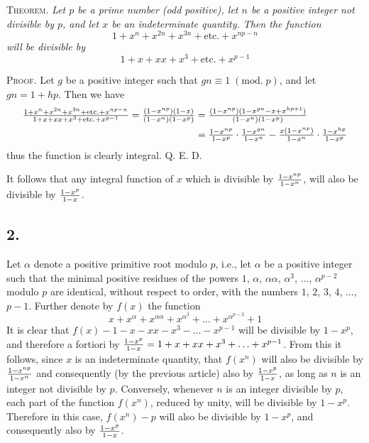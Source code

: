 \documentclass[twoside,12pt]{memoir}
\renewcommand{\pmod}[1]{\;(\textrm{mod.}\;#1)}
\let\oldfrac\frac
\def\frac#1#2{\mathchoice{\tfrac{#1}{#2}}{\oldfrac{#1}{#2}}{\genfrac{}{}{}{2}{#1}{#2\mathstrut}}{\genfrac{}{}{}{3}{#1}{#2\mathstrut}}}
\begin{document}
\textsc{Theorem.} \textit{Let \(p\) be a prime number (odd positive), let \(n\) be a positive integer not divisible by \(p\), and let \(x\) be an indeterminate quantity.  Then the function}
\[1+x^{n}+x^{2 n}+x^{3 n}+\text{etc{.}}+x^{n p-n}\]
\textit{will be divisible by}
\[1+x+x x+x^{3}+\text{etc{.}}+x^{p-1}\]
 
\textsc{Proof.} Let \(g\) be a positive integer such that \(g n \equiv 1\pmod{p}\), and let \(g n=1+h p\). Then we have
\[\begin{aligned}
\frac{1+x^{n}+x^{2 n}+x^{3 n}+\text{etc{.}}+x^{n p-n}}{1+x+x x+x^{3}+\text{etc{.}}+x^{p-1}}=\frac{(1-x^{n p})(1-x)}{(1-x^{n})(1-x^{p})} & =\frac{(1-x^{n p})(1-x^{g n}-x+x^{h p+1})}{(1-x^{n})(1-x^{p})} \\
& =\frac{1-x^{n p}}{1-x^{p}} \cdot \frac{1-x^{g n}}{1-x^{n}}-\frac{x(1-x^{n p})}{1-x^{n}} \cdot \frac{1-x^{h p}}{1-x^{p}}
\end{aligned}\]
thus the function is clearly integral. Q. E. D.
 
It follows that any integral function of \(x\) which is divisible by \(\frac{1-x^{n p}}{1-x^{n}}\), will also be divisible by \(\frac{1-x^{p}}{1-x}\).
%

\subsection*{2.}

Let \(\alpha\) denote a positive primitive root modulo \(p\), i{.}e{.}, let \(\alpha\) be a positive integer such that the minimal positive residues of the powers \(1\), \(\alpha\), \(\alpha \alpha\), \(\alpha^{3}\), \(\ldots\), \(\alpha^{p-2}\) modulo \(p\) are identical, without respect to order, with the numbers \(1\), \(2\), \(3\), \(4\), \(\ldots\), \(p-1\). Further denote by \(f(x)\) the function
\[x+x^{\alpha}+x^{\alpha \alpha}+x^{\alpha^{3}}+\ldots+x^{\alpha^{p-2}}+1\]
It is clear that \(f(x)-1-x-x x-x^{3}-\ldots-x^{p-1}\) will be divisible by \(1-x^{p}\), and therefore a fortiori by \(\frac{1-x^{p}}{1-x}=1+x+x x+x^{3}+\ldots+x^{p-1}\). From this it follows, since \(x\) is an indeterminate quantity, that \(f(x^{n})\) will also be divisible by \(\frac{1-x^{n p}}{1-x^{n}}\) and consequently (by the previous article) also by \(\frac{1-x^{p}}{1-x}\), as long as \(n\) is an integer not divisible by \(p\). Conversely, whenever \(n\) is an integer divisible by \(p\), each part of the function \(f(x^{n})\), reduced by unity, will be divisible by \(1-x^{p}\). Therefore in this case, \(f(x^{n})-p\) will also be divisible by \(1-x^{p}\), and consequently also by \(\frac{1-x^{p}}{1-x}\).
%
\end{document}
